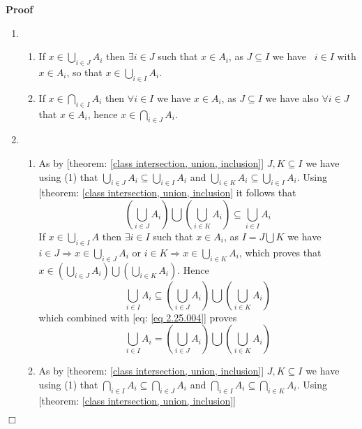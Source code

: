 \documentclass{book}
\newenvironment{proof}{\noindent\textbf{Proof\ }}{\hspace*{\fill}$\Box$\medskip}
\begin{document}
\begin{proof}
  
  \begin{enumerate}
    \item 
    \begin{enumerate}
      \item If $x \in \bigcup_{i \in J} A_i$ then $\exists i \in J$ such that
      $x \in A_i$, as $J \subseteq I$ we have \ $i \in I$ with $x \in A_i$, so
      that $x \in \bigcup_{i \in I} A_i$.
      
      \item If $x \in \bigcap_{i \in I} A_i$ then $\forall i \in I$ we have $x
      \in A_i$, as $J \subseteq I$ we have also $\forall i \in J$ that $x \in
      A_i$, hence $x \in \bigcap_{i \in J} A_i$.
    \end{enumerate}
    \item 
    \begin{enumerate}
      \item As by [theorem: \ref{class intersection, union, inclusion}] $J, K
      \subseteq I$ we have using (1) that $\bigcup_{i \in J} A_i \subseteq
      \bigcup_{i \in I} A_i$ and $\bigcup_{i \in K} A_i \subseteq \bigcup_{i
      \in I} A_i$. Using [theorem: \ref{class intersection, union, inclusion}
      it follows that
      \begin{equation}
        \label{eq 2.25.004} \left( \bigcup_{i \in J} A_i \right) \bigcup
        \left( \bigcup_{i \in K} A_i \right) \subseteq \bigcup_{i \in I} A_i
      \end{equation}
      If $x \in \bigcup_{i \in I} A$ then $\exists i \in I$ such that $x \in
      A_i$, as $I = J \bigcup K$ we have $i \in J \Rightarrow x \in \bigcup_{i
      \in J} A_i$ or $i \in K \Rightarrow x \in \bigcup_{i \in K} A_i$, which
      proves that $x \in \left( \bigcup_{i \in J} A_i \right) \bigcup \left(
      \bigcup_{i \in K} A_i \right)$. Hence
      \[ \bigcup_{i \in I} A_i \subseteq \left( \bigcup_{i \in J} A_i \right)
         \bigcup \left( \bigcup_{i \in K} A_i \right) \]
      which combined with [eq: \ref{eq 2.25.004}] proves
      \[ \bigcup_{i \in I} A_i = \left( \bigcup_{i \in J} A_i \right) \bigcup
         \left( \bigcup_{i \in K} A_i \right) \]
      \item As by [theorem: \ref{class intersection, union, inclusion}] $J, K
      \subseteq I$ we have using (1) that $\bigcap_{i \in I} A_i \subseteq
      \bigcap_{i \in J} A_i$ and $\bigcap_{i \in I} A_i \subseteq \bigcap_{i
      \in K} A_i$. Using [theorem: \ref{class intersection, union, inclusion}]

\end{enumerate}
\end{enumerate}
\end{proof}
\end{document}
